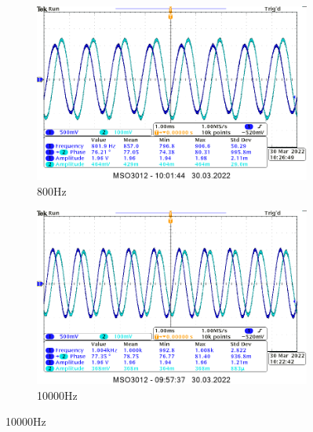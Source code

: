 {\begin{figure}[H]
    \centering
    \begin{subfigure}[h]{0.4\textwidth}
        \includegraphics[width=\textwidth]{img_osciloscope/RC/RC_800Hz_cropped.png}
        \caption*{800Hz}
    \end{subfigure}
    \begin{subfigure}[h]{0.4\textwidth}
        \includegraphics[width=\textwidth]{img_osciloscope/RC/RC_1000Hz_cropped.png}
        \caption*{10000Hz}
    \end{subfigure}
\end{figure}
}

